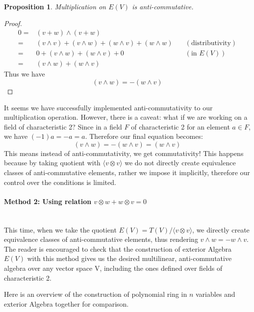 \documentclass[12pt]{article}
\newtheorem{proposition}[theorem]{Proposition}
\numberwithin{theorem}{section}
\numberwithin{equation}{theorem}
\begin{document}
\begin{proposition}
    Multiplication on $E(V)$ is anti-commutative.
\end{proposition}
\begin{proof}
    \begin{align*}
        0 = &(v+w) \wedge (v+w)\\
        = &(v \wedge v) + (v \wedge w) + (w \wedge v) +  (w \wedge w) \quad &(\text{distributivity})\\
        = &0 + (v \wedge w) + (w \wedge v) + 0 \quad &(\text{in } E(V))\\
        = &(v \wedge w) + (w \wedge v)
    \end{align*}
    Thus we have
    $$(v \wedge w) = -(w \wedge v)$$
\end{proof}

It seems we have successfully implemented anti-commutativity to our multiplication operation. However, there is a caveat: what if we are working on a field of characteristic 2? Since in a field $F$ of characteristic 2 for an element $a \in F$, we have $(-1)a = -a = a$. Therefore our final equation becomes:
$$(v \wedge w) = -(w \wedge v) = (w \wedge v)$$
This means instead of anti-commutativity, we get commutativity! This happens because by taking quotient with $\langle v \otimes v\rangle$ we do not directly create equivalence classes of anti-commutative elements, rather we impose it implicitly, therefore our control over the conditions is limited.

\paragraph{Method 2: Using relation $v \otimes w + w \otimes v = 0 $}\mbox{}\\
This time, when we take the quotient $E(V) = T(V)/\langle v \otimes v\rangle$, we directly create equivalence classes of anti-commutative elements, thus rendering $v \wedge w = -w \wedge v$. The reader is encouraged to check that the construction of exterior Algebra $E(V)$ with this method gives us the desired multilinear, anti-commutative algebra over any vector space V, including the ones defined over fields of characteristic 2.

Here is an overview of the construction of polynomial ring in $n$ variables and exterior Algebra together for comparison.
\end{document}
